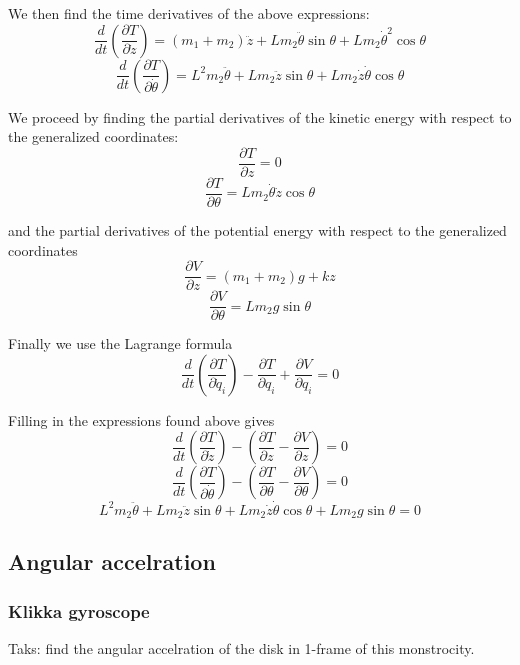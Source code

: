 We then find the time derivatives of the above expressions:
\[
\frac{d}{dt} \left( \frac{\partial T}{\partial \dot{z}} \right) = (m_1 + m_2) \ddot{z} + L m_2 \ddot{\theta} \sin \theta + L m_2 \dot{\theta}^2 \cos \theta
\]
\[
\frac{d}{dt} \left( \frac{\partial T}{\partial \dot{\theta}} \right) = L^2 m_2 \ddot{\theta} + L m_2 \ddot{z} \sin \theta + L m_2 \dot{z} \dot{\theta} \cos \theta
\]

We proceed by finding the partial derivatives of the kinetic energy with respect to the generalized coordinates:
\[
\frac{\partial T}{\partial z} = 0
\]
\[
\frac{\partial T}{\partial \theta} = L m_2 \dot{\theta} \dot{z} \cos \theta
\]

and the partial derivatives of the potential energy with respect to the generalized coordinates
\[
\frac{\partial V}{\partial z} = (m_1 + m_2) g + k z
\]
\[
\frac{\partial V}{\partial \theta} = L m_2 g \sin \theta
\]

Finally we use the Lagrange formula
\[
\frac{d}{dt} \left( \frac{\partial T}{\partial \dot{q}_i} \right) - \frac{\partial T}{\partial q_i} + \frac{\partial V}{\partial q_i} = 0
\]

Filling in the expressions found above gives
\[
\frac{d}{dt} \left( \frac{\partial T}{\partial \dot{z}} \right) - \left( \frac{\partial T}{\partial z} - \frac{\partial V}{\partial z} \right) = 0
\]
\[
\frac{d}{dt} \left( \frac{\partial T}{\partial \dot{\theta}} \right) - \left( \frac{\partial T}{\partial \theta} - \frac{\partial V}{\partial \theta} \right) = 0
\]
\[
L^2 m_2 \ddot{\theta} + L m_2 \ddot{z} \sin \theta + L m_2 \dot{z} \dot{\theta} \cos \theta + L m_2 g \sin \theta = 0
\]



\newpage
\subsection{Angular accelration}

\subsubsection{Klikka gyroscope}
Taks: find the angular accelration of the disk in 1-frame of this monstrocity.

